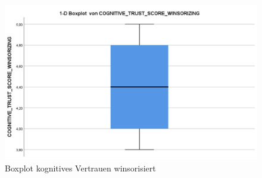 \documentclass[a4paper,11pt]{article}%
\renewcommand{\\}{\vspace*{0.5\baselineskip} \newline}
\begin{document}
	
\begin{figure}[H]
\centering
		\begin{footnotesize}
			\includegraphics[scale=0.5]{Abbildungen/Post_QuestionnaireStatistiks/boxplot_cognitive_trust_winsorisiert}\\
			\caption{Boxplot kognitives Vertrauen winsorisiert}
			\label{fig:boxplot_cognitive_trust_winsorisiert}
		\end{footnotesize}
	\end{figure}	
\end{document}

